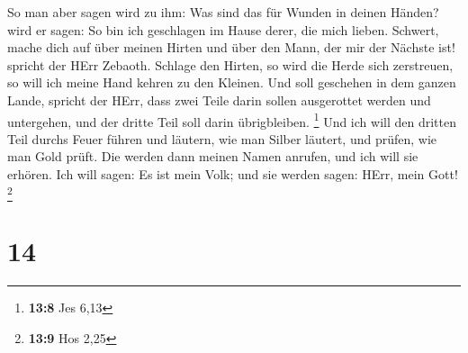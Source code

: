  So man aber sagen wird zu ihm: Was sind das für Wunden in
deinen Händen? wird er sagen: So bin ich geschlagen im Hause derer, die
mich lieben.  Schwert, mache dich auf über meinen Hirten und
über den Mann, der mir der Nächste ist! spricht der HErr Zebaoth.
Schlage den Hirten, so wird die Herde sich zerstreuen, so will ich meine
Hand kehren zu den Kleinen.  Und soll geschehen in dem
ganzen Lande, spricht der HErr, dass zwei Teile darin sollen ausgerottet
werden und untergehen, und der dritte Teil soll darin übrigbleiben.
\footnote{\textbf{13:8} Jes 6,13}  Und ich will den dritten
Teil durchs Feuer führen und läutern, wie man Silber läutert, und
prüfen, wie man Gold prüft. Die werden dann meinen Namen anrufen, und
ich will sie erhören. Ich will sagen: Es ist mein Volk; und sie werden
sagen: HErr, mein Gott! \footnote{\textbf{13:9} Hos 2,25}

\hypertarget{section-6}{%
\section{14}\label{section-6}}

